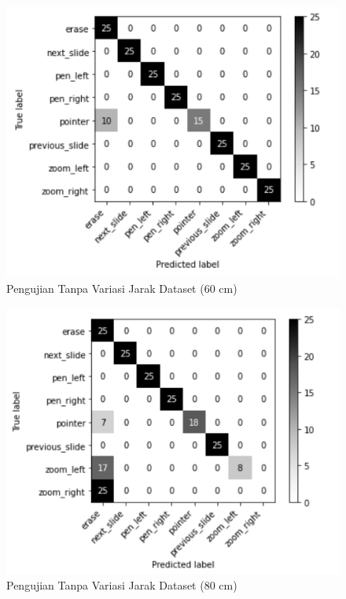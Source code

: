 \begin{figure}[!htb]
  \centering
  \includegraphics[scale=0.79]{gambar/pengujian-jarak/homogen-dataset/60cm.png}
  \caption{Pengujian Tanpa Variasi Jarak Dataset (60 cm)}
  \label{fig:Pengujian Tanpa Variasi Jarak Dataset (60 cm)}
\end{figure}

\begin{figure}[!htb]
  \centering
  \includegraphics[scale=0.79]{gambar/pengujian-jarak/homogen-dataset/80cm.png}
  \caption{Pengujian Tanpa Variasi Jarak Dataset (80 cm)}
  \label{fig:Pengujian Tanpa Variasi Jarak Dataset (80 cm)}
\end{figure}

